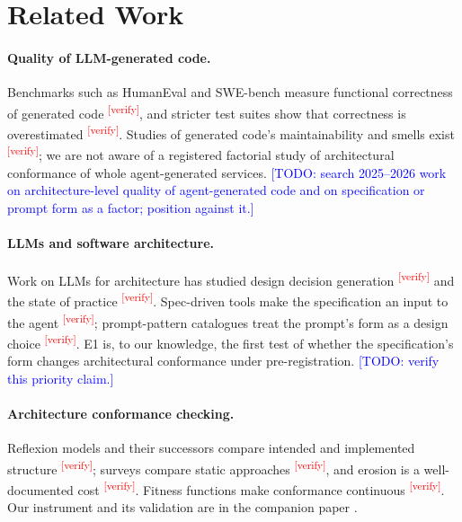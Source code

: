 \documentclass[10pt,a4paper]{article}
\newcommand{\citeneeded}[1]{\cite{#1}\textsuperscript{\textcolor{red}{\tiny[verify]}}}
\newcommand{\todo}[1]{\textcolor{blue}{[TODO: #1]}}
\begin{document}
\section{Related Work}\label{sec:related}

\paragraph{Quality of LLM-generated code.} Benchmarks such as HumanEval and SWE-bench measure functional correctness
of generated code \citeneeded{chen2021codex,jimenez2024swebench}, and stricter test suites show that correctness is
overestimated \citeneeded{liu2023evalplus}. Studies of generated code's maintainability and smells exist
\citeneeded{siddiq2024quality}; we are not aware of a registered factorial study of architectural conformance of
whole agent-generated services. \todo{search 2025--2026 work on architecture-level quality of agent-generated code
and on specification or prompt form as a factor; position against it.}

\paragraph{LLMs and software architecture.} Work on LLMs for architecture has studied design decision generation
\citeneeded{dhar2024adr} and the state of practice \citeneeded{jahic2024practice}. Spec-driven tools make the
specification an input to the agent \citeneeded{speckit2025,kiro2025}; prompt-pattern catalogues treat the prompt's
form as a design choice \citeneeded{white2023prompt}. E1 is, to our knowledge, the first test of whether the
specification's form changes architectural conformance under pre-registration. \todo{verify this priority claim.}

\paragraph{Architecture conformance checking.} Reflexion models and their successors compare intended and implemented
structure \citeneeded{murphy1995reflexion,koschke2003hierarchical}; surveys compare static approaches
\citeneeded{knodel2007comparison,passos2010static}, and erosion is a well-documented cost
\citeneeded{desilva2012erosion,rosik2011drift}. Fitness functions make conformance continuous
\citeneeded{ford2017evolutionary}. Our instrument and its validation are in the companion paper
\cite{daedalus2026tool}.
\end{document}
